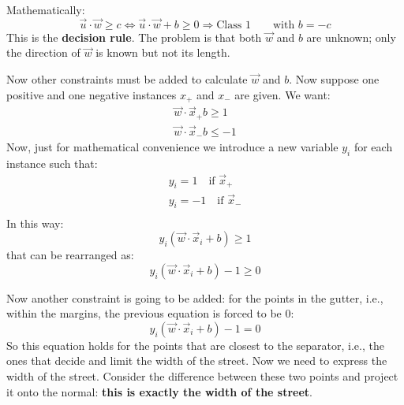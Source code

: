 \documentclass[12pt, letterpaper]{article}
\theoremstyle{definition}
\let\tb\textbf
\begin{document}
Mathematically:
\begin{equation}
\vec{u}\cdot \vec{w} \ge c \Leftrightarrow \vec{u}\cdot \vec{w} + b \ge0\Rightarrow \text{Class } 1 \quad\quad \text{with } b=-c
\end{equation}
This is the \tb{decision rule}. The problem is that both $\vec{w}$ and $b$ are unknown; only the direction of $\vec{w}$ is known but not its length.

Now other constraints must be added to calculate $\vec{w}$ and $b$. Now suppose one positive and one negative instances $x_+$ and $x_-$ are given. We want:
\begin{equation}
\begin{aligned}
\vec{w} \cdot \vec{x}_+ b \ge 1\\
\vec{w} \cdot \vec{x}_- b \le -1
\end{aligned}
\end{equation}
Now, just for mathematical convenience we introduce a new variable $y_i$ for each instance such that:
\begin{equation}
\begin{aligned}
y_i = 1 \quad \text{if } \vec{x}_+\\
y_i = -1 \quad \text{if } \vec{x}_-\\ 
\end{aligned}
\end{equation}
In this way:
\begin{equation}
y_i (\vec{w}\cdot \vec{x}_i + b) \ge 1
\end{equation}
that can be rearranged as:
\begin{equation}
y_i (\vec{w}\cdot \vec{x}_i + b) -1 \ge 0
\end{equation}

Now another constraint is going to be added: for the points in the gutter, i.e., within the margins, the previous equation is forced to be $0$:
\begin{equation}
y_i (\vec{w}\cdot \vec{x}_i + b) -1 = 0
\end{equation}
So this equation holds for the points that are closest to the separator, i.e., the ones that decide and limit the width of the street. Now we need to express the width of the street. Consider the difference between these two points and project it onto the normal: \textbf{this is exactly the width of the street}.


\newpage
\end{document}
